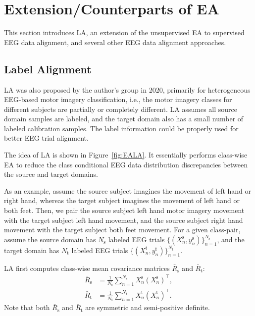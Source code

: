 \documentclass[journal]{IEEEtran}
\begin{document}
\section{Extension/Counterparts of EA} \label{sect:ext}

This section introduces LA, an extension of the unsupervised EA to supervised EEG data alignment, and several other EEG data alignment approaches.

\subsection{Label Alignment}

LA \cite{drwuLA2020} was also proposed by the author's group in 2020, primarily for heterogeneous EEG-based motor imagery classification, i.e., the motor imagery classes for different subjects are partially or completely different. LA assumes all source domain samples are labeled, and the target domain also has a small number of labeled calibration samples. The label information could be properly used for better EEG trial alignment.

The idea of LA is shown in Figure~\ref{fig:EALA}. It essentially performs class-wise EA to reduce the class conditional  EEG data distribution discrepancies between the source and target domains.

As an example, assume the source subject imagines the movement of left hand or right hand, whereas the target subject imagines the movement of left hand or both feet. Then, we pair the source subject left hand motor imagery movement with the target subject left hand movement, and the source subject right hand movement with the target subject both feet movement. For a given class-pair, assume the source domain has $N_\mathrm{s}$ labeled EEG trials $\{(X_n^\mathrm{s},y_n^\mathrm{s})\}_{n=1}^{N_\mathrm{s}}$, and the target domain has $N_\mathrm{t}$ labeled EEG trials $\{(X_n^\mathrm{t},y_n^\mathrm{t})\}_{n=1}^{N_\mathrm{t}}$.

LA first computes class-wise mean covariance matrices $\bar{R}_\mathrm{s}$ and $\bar{R}_\mathrm{t}$:
\begin{align}
  \bar{R}_\mathrm{s}&=\frac{1}{N_\mathrm{s}}\sum_{n=1}^{N_\mathrm{s}} X_n^\mathrm{s} (X_n^\mathrm{s})^\top, \\
  \bar{R}_\mathrm{t}&=\frac{1}{N_\mathrm{t}}\sum_{n=1}^{N_\mathrm{t}} X_n^\mathrm{t} (X_n^\mathrm{t})^\top.
\end{align}
Note that both $\bar{R}_\mathrm{s}$ and $\bar{R}_\mathrm{t}$ are symmetric and semi-positive definite.
\end{document}
